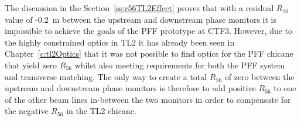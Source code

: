 







The discussion in the Section~\ref{ss:r56TL2Effect} proves that with a residual \(R_{56}\) value of -0.2~m between the upstream and downstream phase monitors it is impossible to achieve the goals of the PFF prototype at CTF3. However, due to the highly constrained optics in TL2 it has already been seen in Chapter~\ref{c:tl2Optics} that it was not possible to find optics for the PFF chicane that yield zero \(R_{56}\) whilst also meeting requirements for both the PFF system and transverse matching. The only way to create a total \(R_{56}\) of zero between the upstream and downstream phase monitors is therefore to add positive \(R_{56}\) to one of the other beam lines in-between the two monitors in order to compensate for the negative \(R_{56}\) in the TL2 chicane. 

